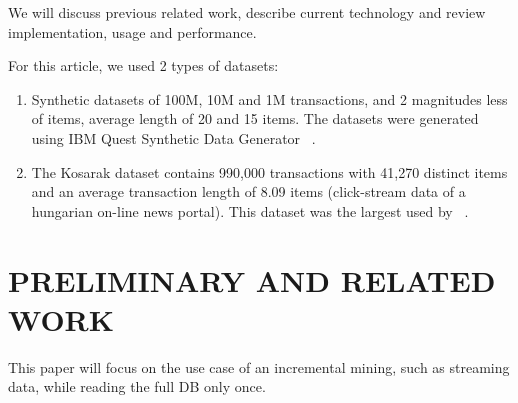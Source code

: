 \documentclass[sigconf, nonacm]{acmart}
\begin{document}
We will discuss previous related work, describe current technology and review implementation, usage and performance.

For this article, we used 2 types of datasets:
\begin{enumerate}
\item Synthetic datasets of 100M, 10M and 1M transactions, and 2 magnitudes less of items, average length of 20 and 15 items. The datasets were generated using IBM Quest Synthetic Data Generator ~\cite{agrawal1994quest}.
\item The Kosarak dataset contains 990,000 transactions with 41,270 distinct items and an average transaction length of 8.09 items (click-stream data of a hungarian on-line news portal). This dataset was the largest used by ~\cite{tanbeer2009efficient}.
\end{enumerate}

\section{PRELIMINARY AND RELATED WORK}

This paper will focus on the use case of an incremental mining, such as streaming data, while reading the full DB only once.

\end{document}
